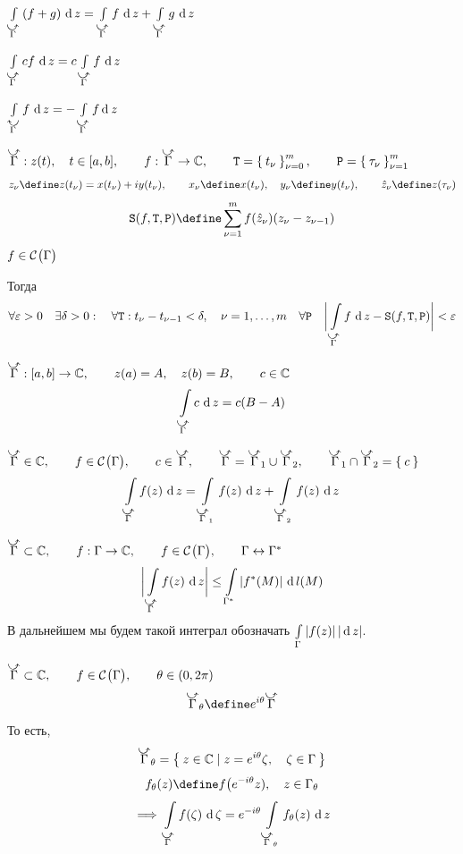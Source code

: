 \begin{props}
	\item $ \cint[z]{\curvedir\Gamma}{(f + g)} = \cint[z]{\curvedir\Gamma}f + \cint[z]{\curvedir\Gamma}g $

	\item $ \cint[z]{\curvedir\Gamma}{cf} = c \cint[z]{\curvedir\Gamma}f $

	\item $ \cint[z]{\curvedir[0]\Gamma}f = - \int\limits_{\curvedir \Gamma} f \di z $

	\item $ \curvedir\Gamma : z(t), \quad t \in [a, b], \qquad f : \curvedir\Gamma \to \Co, \qquad \mathtt T = \seqz[m]{t_\nu}\nu, \qquad \mathtt P = \seq[m]{\tau_\nu}\nu $
	$$ z_\nu \define z(t_\nu) = x(t_\nu) + iy(t_\nu), \qquad x_\nu \define x(t_\nu), \quad y_\nu \define y(t_\nu), \qquad \hat z_\nu \define z(\tau_\nu) $$
	$$ \mathtt S(f, \mathtt T, \mathtt P) \define \sum_{\nu = 1}^m f(\hat z_\nu) (z_\nu - z_{\nu - 1}) $$
	$ f \in \mathcal{C}^{} \big( {\Gamma} \big)  $

	Тогда
	$$ \forall \eps > 0 \quad \exists \delta > 0 : \quad \forall \mathtt T : t_\nu - t_{\nu - 1} < \delta, \quad \nu = 1, \dots, m \quad \forall \mathtt P \quad \bigg| \cint[z]{\curvedir\Gamma}f - \mathtt S(f, \mathtt T, \mathtt P) \bigg| < \eps $$

	\item\label{it:curve_it:5} $ \curvedir\Gamma : [a, b] \to \Co, \qquad z(a) = A, \quad z(b) = B, \qquad c \in \Co $
	$$ \cint[z]{\curvedir\Gamma}c = c(B - A) $$

	\item\label{it:curve_int:6} $ \curvedir \Gamma \in \Co, \qquad f \in \Cont \Gamma, \qquad c \in \curvedir \Gamma, \qquad \curvedir \Gamma = \curvedir \Gamma_1 \cup \curvedir \Gamma_2, \qquad \curvedir\Gamma_1 \cap \curvedir\Gamma_2 = \set c $
		$$ \cint[z]{\curvedir \Gamma}{f(z)} = \cint[z]{\curvedir\Gamma_1}{f(z)} + \cint[z]{\curvedir\Gamma_2}{f(z)} $$

	\item\label{it:curve_int:7} $ \curvedir\Gamma \sub \Co, \qquad f : \Gamma \to \Co, \qquad f \in \Cont \Gamma, \qquad \Gamma \leftrightarrow \Gamma^* $
	$$ \bigg| \cint[z]{\curvedir\Gamma}{f(z)} \bigg| \le \cint{\Gamma^*}{|f^*(M)|} $$
	В дальнейшем мы будем такой интеграл обозначать $ \int\limits_{\Gamma} {|f(z)|} \, |\operatorname{d} {z}| $.

	\item\label{it:curve_int:8} $ \curvedir\Gamma \sub \Co, \qquad f \in \Cont \Gamma, \qquad \theta \in (0, 2\pi) $
		$$ \curvedir\Gamma_\theta \define e^{i\theta}\curvedir\Gamma $$
		То есть,
		$$ \curvedir\Gamma_\theta = \set{z \in \Co \mid z = e^{i\theta}\zeta, \quad \zeta \in \Gamma} $$
		$$ f_\theta(z) \define f \big( e^{-i\theta}z), \quad z \in \Gamma_\theta $$
		$$ \implies \cint[\zeta]{\curvedir\Gamma}{f(\zeta)} = e^{-i\theta} \cint[z]{\curvedir\Gamma_\theta}{f_\theta(z)} $$
\end{props}

